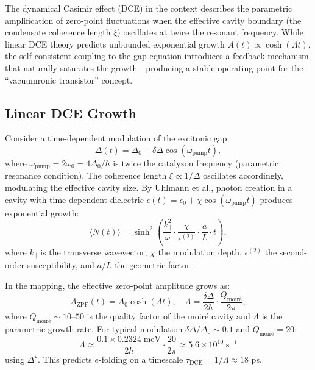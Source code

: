 \documentclass[11pt,letterpaper]{article}
\begin{document}
The dynamical Casimir effect (DCE) in the \TEVC{} context describes the parametric amplification of zero-point fluctuations when the effective cavity boundary (the condensate coherence length $\xi$) oscillates at twice the resonant frequency. While linear DCE theory predicts unbounded exponential growth $A(t) \propto \cosh(\Lambda t)$, the self-consistent coupling to the gap equation introduces a feedback mechanism that naturally saturates the growth---producing a stable operating point for the ``vacuumronic transistor'' concept.

\subsection{Linear DCE Growth}

Consider a time-dependent modulation of the excitonic gap:
\begin{equation}
\Delta(t) = \Delta_0 + \delta\Delta \cos(\omega_{\text{pump}} t),
\end{equation}
where $\omega_{\text{pump}} = 2\omega_0 = 4\Delta_0/\hbar$ is twice the catalyzon frequency (parametric resonance condition). The coherence length $\xi \propto 1/\Delta$ oscillates accordingly, modulating the effective cavity size. By Uhlmann et al.\cite{Uhlmann2004}, photon creation in a cavity with time-dependent dielectric $\epsilon(t) = \epsilon_0 + \chi \cos(\omega_{\text{pump}} t)$ produces exponential growth:
\begin{equation}
\langle N(t) \rangle = \sinh^2\left(\frac{k_\parallel^2}{\omega} \cdot \frac{\chi}{\epsilon^{(2)}} \cdot \frac{a}{L} \cdot t \right),
\end{equation}
where $k_\parallel$ is the transverse wavevector, $\chi$ the modulation depth, $\epsilon^{(2)}$ the second-order susceptibility, and $a/L$ the geometric factor.

In the \TEVC{} mapping, the effective zero-point amplitude grows as:
\begin{equation}
A_{\text{ZPF}}(t) = A_0 \cosh(\Lambda t), \quad \Lambda = \frac{\delta\Delta}{2\hbar} \cdot \frac{Q_{\text{moir\'{e}}}}{2\pi},
\label{eq:linear_dce}
\end{equation}
where $Q_{\text{moir\'{e}}} \sim 10$--$50$ is the quality factor of the moiré cavity and $\Lambda$ is the parametric growth rate. For typical modulation $\delta\Delta / \Delta_0 \sim 0.1$ and $Q_{\text{moir\'{e}}} = 20$:
\begin{equation}
\Lambda \approx \frac{0.1 \times 0.2324 \;\text{meV}}{2\hbar} \cdot \frac{20}{2\pi} \approx 5.6 \times 10^{10} \;\text{s}^{-1}
\end{equation}
using $\Delta^\star$. This predicts $e$-folding on a timescale $\tau_{\text{DCE}} = 1/\Lambda \approx 18$ ps.
\end{document}
